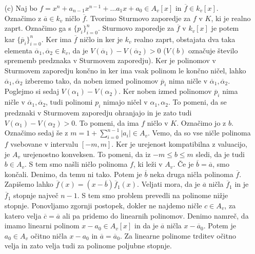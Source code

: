 \documentclass[a4paper, 12pt]{article}
\begin{document}
\begin{enumerate}
\item[(c)] Naj bo $f=x^n + a_{n-1}x^{n-1} + \dots a_1 x  + a_0\in A_v[x] $ in $\overline{f}\in k_v[x]$. Označimo z $\overline{a} \in k_v$ ničlo $\overline{f}$. Tvorimo Sturmovo zaporedje za $f$ v $K$, ki je realno zaprt. Označimo ga s $\{p_i\}_{i=0}^n$. Sturmovo zaporedje za $\overline{f}$ v $k_v[x]$ je potem kar $\{\overline{p}_i\}_{i=0}^n$. Ker ima $\overline{f}$ ničlo in ker je $k_v$ realno zaprt, obstajata dva taka elementa $\overline{\alpha}_1,\overline{\alpha}_2\in k_v$, da je $V(\overline{\alpha}_1) - V(\overline{\alpha}_2) >0$ ($V(b)$ označuje število sprememb predznaka v Sturmovem zaporedju). Ker je polinomov v Sturmovem zaporedju končno in ker ima vsak polinom le končno ničel, lahko $\overline{\alpha}_1,\overline{\alpha}_2$ izberemo tako, da noben izmed polinomov $\overline{p}_i$ nima ničle v $\overline{\alpha}_1, \overline{\alpha}_2$. Poglejmo si sedaj $V(\alpha_1) - V(\alpha_2)$. Ker noben izmed polinomov $\overline{p}_i$ nima ničle v $\overline{\alpha}_1,\overline{\alpha}_2$, tudi polinomi $p_i$ nimajo ničel v $\alpha_1, \alpha_2$. To pomeni, da se predznaki v Sturmovem zaporedju ohranjajo in je zato tudi $V(\alpha_1) - V(\alpha_2)>0$. To pomeni, da ima $f$ ničlo v $K$. Označimo jo z $b$.  Označimo sedaj še z $m = 1+ \sum_{i=0}^{n-1} |a_i| \in A_v$. Vemo, da so vse ničle polinoma $f$ vsebovane v intervalu $[-m,m]$. Ker je urejenost kompatibilna z valuacijo, je $A_v$ urejenostno konveksen. To pomeni, da iz $-m \le b \le m$ sledi, da je tudi $b\in A_v$. S tem smo našli ničlo polinoma $f$, ki leži v $A_v$. Če je $\overline{b} = \overline{a}$, smo končali. Denimo, da temu  ni tako. Potem je $\overline{b}$ neka druga ničla polinoma $\overline{f}$. Zapišemo lahko $\overline{f}(x)  = (x-\overline{b}) \overline{f}_1(x)$. Veljati mora, da je $\overline{a}$ ničla $\overline{f}_1$ in je $\overline{f}_1$ stopnje največ $n-1$. S tem smo problem prevedli na polinome nižje stopnje. Ponovljamo zgornji postopek, dokler ne najdemo ničle $c\in A_v$, za katero velja $\overline{c} = \overline{a}$ ali pa pridemo do linearnih polinomov. Denimo namreč, da imamo linearni polinom $x-a_0 \in A_v[x]$ in da je $\overline{a}$ ničla $x- \overline{a}_0$. Potem je $a_0 \in A_v$ očitno ničla $x-a_0$ in $\overline{a} = \overline{a}_0$. Za linearne polinome trditev očitno velja in zato velja tudi za polinome poljubne stopnje.
\end{enumerate} 
\end{document}
